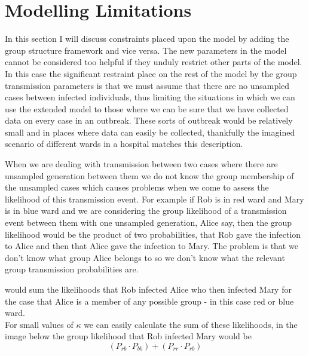\documentclass[11pt,a4paper]{report}
\begin{document}
\section{Modelling Limitations}
In this section I will discuss constraints placed upon the model by adding the group structure framework and vice versa. The new parameters in the model cannot be considered too helpful if they unduly restrict other parts of the model. In this case the significant restraint place on the rest of the model by the group transmission parameters is that we must assume that there are no unsampled cases between infected individuals, thus limiting the situations in which we can use the extended model to those where we can be sure that we have collected data on every case in an outbreak. These sorts of outbreak would be relatively small and in places where data can easily be collected, thankfully the imagined scenario of different wards in a hospital matches this description.

When we are dealing with transmission between two cases where there are unsampled generation between them we do not know the group membership of the unsampled cases which causes problems when we come to assess the likelihood of this transmission event. For example if Rob is in red ward and Mary is in blue ward and we are considering the group likelihood of a transmission event between them with one unsampled generation, Alice say, then the group likelihood would be the product of two probabilities, that Rob gave the infection to Alice and then that Alice gave the infection to Mary. The problem is that we don't know what group Alice belongs to so we don't know what the relevant group transmission probabilities are.

would sum the likelihoods that Rob infected Alice who then infected Mary for the case that Alice is a member of any possible group - in this case red or blue ward.\\
For small values of $\kappa$ we can easily calculate the sum of these likelihoods, in the image below the group likelihood that Rob infected Mary would be
 \[ (P_{rb} \cdot P_{bb}) + (P_{rr} \cdot P_{rb}) \]
\end{document}

